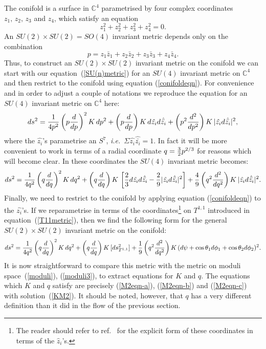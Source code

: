 \documentclass[a4paper,12pt]{article}
\newcommand{\labell}[1]{\label{#1}}
\newcommand{\reef}[1]{(\ref{#1})}
\begin{document}
The conifold is a surface in $\mathbb{C}^4$ parametrised by four
complex coordinates $z_1, \, z_2, \, z_3$ and $z_4$, which satisfy an
equation
\begin{equation}
  z_1 ^2 + z_2 ^2 + z_3 ^2 + z_4 ^2 = 0.
\labell{conifoldeqn}
\end{equation}
An $SU(2) \times SU(2) = SO(4)$ invariant metric depends only on the
combination
\begin{equation}
  p = z_1 \bar{z}_1 + z_2 \bar{z}_2 + z_3 \bar{z}_3 + z_4 \bar{z}_4 .
\end{equation}
Thus, to construct an $SU(2) \times SU(2)$ invariant metric on the
conifold we can start with our equation~\reef{SU(n)metric} for an
$SU(4)$ invariant metric on $\mathbb{C}^4$ and then restrict to the
conifold using equation \reef{conifoldeqn}. For convenience and in
order to adjust a couple of notations we reproduce the equation for an
$SU(4)$ invariant metric on $\mathbb{C}^4$ here:
\begin{equation}
ds^2 = {1 \over 4p^2} \left(p {d \over dp}\right)^2 K\, dp^2 + \left(p {d \over dp}\right) K\, d\hat{z_i} d\hat{\bar{z_i}} + \left(p^2 {d^2 \over dp^2}\right) K \, | \hat{z_i} d\hat{\bar{z_i}}|^2  ,
\end{equation}
where the $\hat{z_i}$'s parametrise an $S^7$, {\it i.e.}~$\Sigma \hat{z_i}
\hat{\bar{z_i}} = 1$. In fact it will be more convenient to work in
terms of a radial coordinate $q = {3 \over 2} p^{2/3}$ for reasons
which will become clear. In these coordinates the $SU(4)$ invariant
metric becomes:
\begin{equation}
ds^2 = {1 \over 4q^2} \left(q {d \over dq}\right)^2 K\, dq^2 + \left(q {d \over dq}\right) K\, \left[{2 \over 3} d\hat{z_i} d\hat{\bar{z_i}} - {2 \over 9} | \hat{z_i} d\hat{\bar{z_i}}|^2 \right] + {4 \over 9} \left(q^2 {d^2 \over dq^2}\right) K \,  | \hat{z_i} d\hat{\bar{z_i}}|^2  .
\end{equation}
Finally, we need to restrict to the conifold by applying equation
\reef{conifoldeqn} to the $\hat{z_i}$'s. If we reparametrise in terms
of the coordinates\footnote{The reader should refer to
  ref.~\cite{candelas} for the explicit form of these coordinates in
  terms of the $\hat{z}_i$'s.}  on $T^{1,1}$ introduced in
equation~\reef{T11metric}, then we find the following form for the
general $SU(2) \times SU(2)$ invariant metric on the conifold:
\begin{equation}
ds^2 = {1 \over 4q^2} \left(q {d \over dq}\right)^2 K\, dq^2 + \left(q {d \over dq}\right) K\, [ds^2 _{T^{1,1}}] + {1 \over 9} \left(q^2 {d^2 \over dq^2}\right) K \, (d\psi + \cos \theta_1 d \phi_1 +\cos \theta_2 d \phi_2)^2  .
\end{equation}
It is now straightforward to compare this metric with the metric on
moduli space~\reef{moduli}, \reef{moduli3}, to extract equations for
$K$ and $q$. The equations which $K$ and $q$ satisfy are precisely
\reef{M2eqn-a}, \reef{M2eqn-b} and \reef{M2eqn-c} with
solution~\reef{KM2}. It should be noted, however, that $q$ has a very
different definition than it did in the flow of the previous section.
\end{document}

